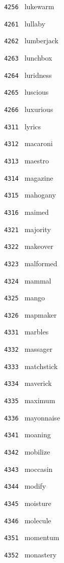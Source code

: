 \documentclass[11pt]{article}
\begin{document}
\begin{multicols}{6}
\noindent \texttt{ 4256 } lukewarm  \par
\noindent \texttt{ 4261 } lullaby  \par
\noindent \texttt{ 4262 } lumberjack  \par
\noindent \texttt{ 4263 } lunchbox  \par
\noindent \texttt{ 4264 } luridness  \par
\noindent \texttt{ 4265 } luscious  \par
\noindent \texttt{ 4266 } luxurious  \par
\noindent \texttt{ 4311 } lyrics  \par
\noindent \texttt{ 4312 } macaroni  \par
\noindent \texttt{ 4313 } maestro  \par
\noindent \texttt{ 4314 } magazine  \par
\noindent \texttt{ 4315 } mahogany  \par
\noindent \texttt{ 4316 } maimed  \par
\noindent \texttt{ 4321 } majority  \par
\noindent \texttt{ 4322 } makeover  \par
\noindent \texttt{ 4323 } malformed  \par
\noindent \texttt{ 4324 } mammal  \par
\noindent \texttt{ 4325 } mango  \par
\noindent \texttt{ 4326 } mapmaker  \par
\noindent \texttt{ 4331 } marbles  \par
\noindent \texttt{ 4332 } massager  \par
\noindent \texttt{ 4333 } matchstick  \par
\noindent \texttt{ 4334 } maverick  \par
\noindent \texttt{ 4335 } maximum  \par
\noindent \texttt{ 4336 } mayonnaise  \par
\noindent \texttt{ 4341 } moaning  \par
\noindent \texttt{ 4342 } mobilize  \par
\noindent \texttt{ 4343 } moccasin  \par
\noindent \texttt{ 4344 } modify  \par
\noindent \texttt{ 4345 } moisture  \par
\noindent \texttt{ 4346 } molecule  \par
\noindent \texttt{ 4351 } momentum  \par
\noindent \texttt{ 4352 } monastery  \par

\end{multicols}
\end{document}
